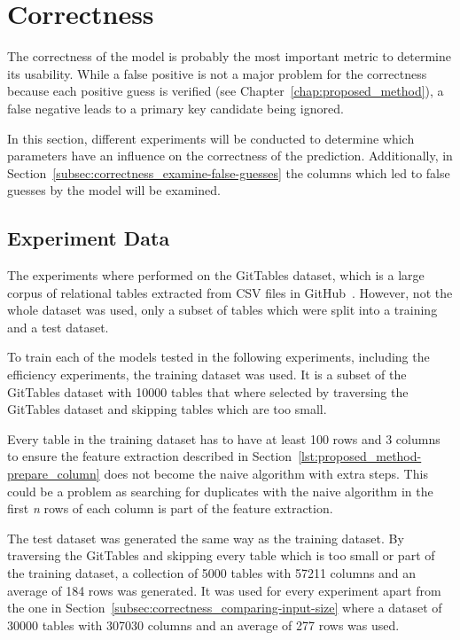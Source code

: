 \section{Correctness}\label{sec:correctness}
The correctness of the model is probably the most important metric to determine its usability. While a false positive is not a major problem for the correctness because each positive guess is verified (see Chapter~\ref{chap:proposed_method}), a false negative leads to a primary key candidate being ignored.

In this section, different experiments will be conducted to determine which parameters have an influence on the correctness of the prediction. Additionally, in Section~\ref{subsec:correctness_examine-false-guesses} the columns which led to false guesses by the model will be examined.


\subsection{Experiment Data}\label{subsec:correctness_experiment-data}
The experiments where performed on the GitTables dataset, which is a large corpus of relational tables extracted from CSV files in GitHub~\cite{gittables-article}. However, not the whole dataset was used, only a subset of tables which were split into a training and a test dataset.

To train each of the models tested in the following experiments, including the efficiency experiments, the training dataset was used. It is a subset of the GitTables dataset with \num{10000} tables that where selected by traversing the GitTables dataset and skipping tables which are too small.

Every table in the training dataset has to have at least \num{100} rows and \num{3} columns to ensure the feature extraction described in Section~\ref{lst:proposed_method-prepare_column} does not become the naive algorithm with extra steps. This could be a problem as searching for duplicates with the naive algorithm in the first \textit{n} rows of each column is part of the feature extraction.

The test dataset was generated the same way as the training dataset. By traversing the GitTables and skipping every table which is too small or part of the training dataset, a collection of \num{5000} tables with \num{57211} columns and an average of \num{184} rows was generated. It was used for every experiment apart from the one in Section~\ref{subsec:correctness_comparing-input-size} where a dataset of \num{30000} tables with \num{307030} columns and an average of \num{277} rows was used.


